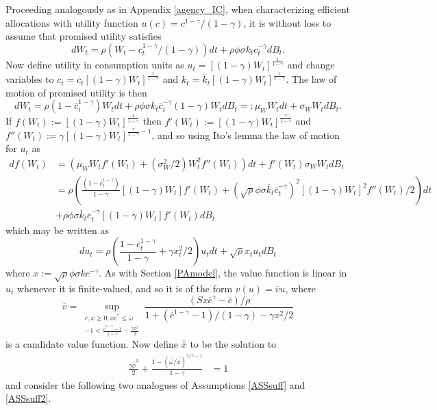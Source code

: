 \documentclass[11pt]{article}
\theoremstyle{plain}
\theoremstyle{definition} %
\begin{document}
Proceeding analogously as in Appendix \ref{agency_IC}, when characterizing efficient allocations with utility function $u(c) = c^{1-\gamma}/(1-\gamma)$, it is without loss to assume that promised utility satisfies
$$
dW_t = \rho{\left(W_t - c_t^{1-\gamma}/(1 - \gamma) \right)}dt + \rho \phi \sigma k_t c_t^{-\gamma} dB_t. 
$$
Now define utility in consumption units as $u_t = [(1-\gamma)W_t]^{\frac{1}{1-\gamma}}$ and change variables to $c_t = \overline{c}_t[(1-\gamma)W_t]^{\frac{1}{1-\gamma}}$ and $k_t = \overline{k}_t[(1-\gamma)W_t]^{\frac{1}{1-\gamma}}$. The law of motion of promised utility is then 
$$
dW_t = \rho{\left(1 - \overline{c}_t^{1-\gamma}\right)}W_t dt + \rho \phi \sigma \overline{k}_t \overline{c}_t^{-\gamma} (1-\gamma)W_t dB_t =: \mu_WW_tdt + \sigma_WW_t dB_t.
$$
If $f(W_t) := [(1-\gamma)W_t]^{\frac{1}{1-\gamma}}$ then $f'(W_t) := [(1-\gamma)W_t]^{\frac{\gamma}{1-\gamma}}$ and $f''(W_t) := \gamma[(1-\gamma)W_t]^{\frac{\gamma}{1-\gamma}-1}$, and so using Ito's lemma the law of motion for $u_t$ as 
\begin{align*}
df(W_t) & = (\mu_WW_t f'(W_t)+ (\sigma_W^2/2)W_t^2f''(W_t))dt + f'(W_t)\sigma_WW_tdB_t
\\ & = \rho {\left( \frac{(1 - \overline{c}_t^{1-\gamma})}{1-\gamma} [(1-\gamma)W_t] f'(W_t) + (\sqrt{\rho} \phi \sigma \overline{k}_t \overline{c}_t^{-\gamma})^2[(1-\gamma)W_t]^2f''(W_t)/2\right)}dt 
\\ & + \rho \phi \sigma \overline{k}_t \overline{c}_t^{-\gamma}[(1-\gamma)W_t] f'(W_t)dB_t
\end{align*}
which may be written as 
$$
du_t = \rho{\left( \frac{1 - \overline{c}_t^{1-\gamma}}{1-\gamma} + \gamma x_t^2/2\right)}u_t dt + \sqrt{\rho} x_t u_t dB_t
$$
where $x := \sqrt{\rho} \phi \sigma k c^{-\gamma}$. As with Section \ref{PAmodel}, the value function is linear in $u_t$ whenever it is finite-valued, and so it is of the form $v(u) = \overline{v}u$, where
\begin{equation}
\overline{v} = \sup_{\substack{\overline{c},x\geq0, x\overline{c}^{\gamma} \leq \overline{\omega} \\ -1 < \frac{\overline{c}^{1-\gamma} - 1}{1-\gamma} - \frac{\gamma x^2}{2}}} \frac{(Sx\overline{c}^{\gamma} - \overline{c})/\rho}{1 + (\overline{c}^{1-\gamma}-1)/(1-\gamma) - \gamma x^2/2}
\label{cand2}
\end{equation} %
is a candidate value function. Now define $\overline{\overline{x}}$ to be the solution to
\begin{align*}
\frac{\gamma \overline{\overline{x}}^2}{2} + \frac{1 - (\overline{\omega}/\overline{\overline{x}})^{1/\gamma-1}}{1-\gamma} & = 1
\end{align*}
and consider the following two analogues of Assumptions \ref{ASSsuff} and \ref{ASSsuff2}. 
\end{document}
